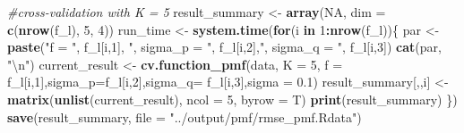 \documentclass[]{article}
\newenvironment{Shaded}{\begin{snugshade}}{\end{snugshade}}
\newcommand{\CharTok}[1]{\textcolor[rgb]{0.31,0.60,0.02}{#1}}
\newcommand{\CommentTok}[1]{\textcolor[rgb]{0.56,0.35,0.01}{\textit{#1}}}
\newcommand{\ControlFlowTok}[1]{\textcolor[rgb]{0.13,0.29,0.53}{\textbf{#1}}}
\newcommand{\DataTypeTok}[1]{\textcolor[rgb]{0.13,0.29,0.53}{#1}}
\newcommand{\DecValTok}[1]{\textcolor[rgb]{0.00,0.00,0.81}{#1}}
\newcommand{\FloatTok}[1]{\textcolor[rgb]{0.00,0.00,0.81}{#1}}
\newcommand{\KeywordTok}[1]{\textcolor[rgb]{0.13,0.29,0.53}{\textbf{#1}}}
\newcommand{\NormalTok}[1]{#1}
\newcommand{\OperatorTok}[1]{\textcolor[rgb]{0.81,0.36,0.00}{\textbf{#1}}}
\newcommand{\OtherTok}[1]{\textcolor[rgb]{0.56,0.35,0.01}{#1}}
\newcommand{\StringTok}[1]{\textcolor[rgb]{0.31,0.60,0.02}{#1}}
\begin{document}
\begin{Shaded}
\begin{Highlighting}[]
\CommentTok{#cross-validation with K = 5}
\NormalTok{result_summary <-}\StringTok{ }\KeywordTok{array}\NormalTok{(}\OtherTok{NA}\NormalTok{, }\DataTypeTok{dim =} \KeywordTok{c}\NormalTok{(}\KeywordTok{nrow}\NormalTok{(f_l), }\DecValTok{5}\NormalTok{, }\DecValTok{4}\NormalTok{)) }
\NormalTok{run_time <-}\StringTok{ }\KeywordTok{system.time}\NormalTok{(}\ControlFlowTok{for}\NormalTok{(i }\ControlFlowTok{in} \DecValTok{1}\OperatorTok{:}\KeywordTok{nrow}\NormalTok{(f_l))\{}
\NormalTok{    par <-}\StringTok{ }\KeywordTok{paste}\NormalTok{(}\StringTok{"f = "}\NormalTok{, f_l[i,}\DecValTok{1}\NormalTok{], }\StringTok{", sigma_p = "}\NormalTok{, f_l[i,}\DecValTok{2}\NormalTok{],}\StringTok{", sigma_q = "}\NormalTok{, f_l[i,}\DecValTok{3}\NormalTok{])}
    \KeywordTok{cat}\NormalTok{(par, }\StringTok{"}\CharTok{\textbackslash{}n}\StringTok{"}\NormalTok{)}
\NormalTok{    current_result <-}\StringTok{ }\KeywordTok{cv.function_pmf}\NormalTok{(data, }\DataTypeTok{K =} \DecValTok{5}\NormalTok{, }\DataTypeTok{f =}\NormalTok{ f_l[i,}\DecValTok{1}\NormalTok{],}\DataTypeTok{sigma_p=}\NormalTok{f_l[i,}\DecValTok{2}\NormalTok{],}\DataTypeTok{sigma_q=}\NormalTok{ f_l[i,}\DecValTok{3}\NormalTok{],}\DataTypeTok{sigma =} \FloatTok{0.1}\NormalTok{)}
\NormalTok{    result_summary[,,i] <-}\StringTok{ }\KeywordTok{matrix}\NormalTok{(}\KeywordTok{unlist}\NormalTok{(current_result), }\DataTypeTok{ncol =} \DecValTok{5}\NormalTok{, }\DataTypeTok{byrow =}\NormalTok{ T) }
    \KeywordTok{print}\NormalTok{(result_summary)}
\NormalTok{\})}
\KeywordTok{save}\NormalTok{(result_summary, }\DataTypeTok{file =} \StringTok{"../output/pmf/rmse_pmf.Rdata"}\NormalTok{)}
\end{Highlighting}
\end{Shaded}
\end{document}
